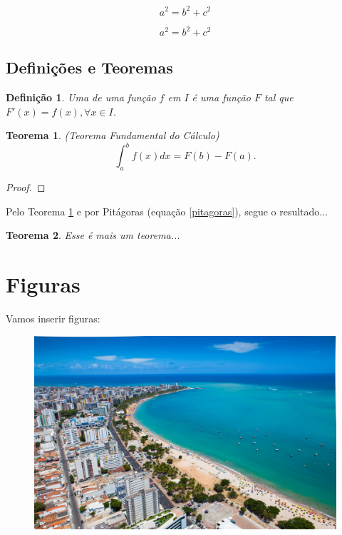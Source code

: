 \documentclass{abntex2}
\newtheorem{definicao}{Definição}[section]  %
\newtheorem{teorema}{Teorema}[chapter]  %
\begin{document}
$$a^2=b^2+c^2$$

\begin{equation}
	a^2=b^2+c^2
	\label{pitagoras}
\end{equation}

\section{Definições e Teoremas}
\begin{definicao}
	Uma  de uma função $f$ em $I$ é uma função $F$ tal que $F'(x)=f(x),\forall x\in I$.
\end{definicao}

\begin{teorema}(Teorema Fundamental do Cálculo)
	\[\int_a^b f(x) dx = F(b)-F(a).\]
	\label{tfc}
\end{teorema}
\begin{proof}
	\lipsum[1]
\end{proof}

Pelo Teorema \ref{tfc} e por Pitágoras (equação \ref{pitagoras}), segue o resultado... 

\begin{teorema}
	Esse é mais um teorema...
\end{teorema}


\chapter{Figuras}
Vamos inserir figuras:
\begin{figure}[h]
	\includegraphics[scale=0.1]{maceio.jpg}
\end{figure}
\end{document}
